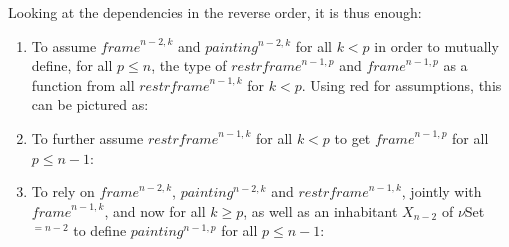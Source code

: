 \documentclass[a4paper,english,cleveref,autoref,thm-restate]{article}
\newcommand{\myframe}{\mathit{frame}}
\newcommand{\painting}{\mathit{painting}}
\newcommand{\restrframe}{\mathit{restrframe}}
\begin{document}
Looking at the dependencies in the reverse order, it is thus enough:
\begin{enumerate}
\item To assume $\myframe^{n-2,k}$ and $\painting^{n-2,k}$ for all $k< p$
  in order to mutually define, for all $p\leq n$, the type of
  $\restrframe^{n-1,p}$ and $\myframe^{n-1,p}$ as a function from all
  $\restrframe^{n-1,k}$ for $k< p$. Using red for assumptions, this
  can be pictured as:
\begin{center}
\end{center}

\item To further assume $\restrframe^{n-1,k}$ for all $k<p$ to get
  $\myframe^{n-1,p}$ for all $p\leq n-1$:
\begin{center}
\end{center}

\item To rely on $\myframe^{n-2,k}$, $\painting^{n-2,k}$ and
  $\restrframe^{n-1,k}$, jointly with $\myframe^{n-1,k}$, and now for all
  $k \geq p$, as well as an inhabitant $X_{n-2}$ of $\nu$Set$^{=n-2}$
  to define $\painting^{n-1,p}$ for all $p \leq n-1$:
\begin{center}
\end{center}


\end{enumerate}
\end{document}

